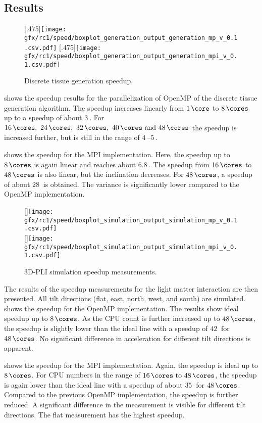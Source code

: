 \subsection{Results}
%
\begin{figure}[!t]
\centering
{}[.475\textwidth]{\texttt{[image: gfx/rc1/speed/boxplot\_generation\_output\_generation\_mp\_v\_0.1.csv.pdf]}}
\hfill
{}[.475\textwidth]{\texttt{[image: gfx/rc1/speed/boxplot\_generation\_output\_generation\_mpi\_v\_0.1.csv.pdf]}}
\caption[]{Discrete tissue generation speedup.}
\end{figure}
%
 shows the speedup results for the parallelization of \ac{OpenMP} of the discrete tissue generation algorithm.
The speedup increases linearly from $\SI{1}{\core}$ to $\SI{8}{\cores}$ up to a speedup of about $\SI{3}{}$.
For $\SIlist{16;24;32;40;48}{\cores}$ the speedup is increased further, but is still in the range of $\SIrange{4}{5}{}$.
\par
%
 shows the speedup for the \ac{MPI} implementation.
Here, the speedup up to $\SI{8}{\cores}$ is again linear and reaches about $\SI{6.8}{}$.
The speedup from $\SI{16}{\cores}$ to $\SI{48}{\cores}$ is also linear, but the inclination decreases.
For $\SI{48}{\cores}$, a speedup of about $\SI{28}{}$ is obtained.
The variance is significantly lower compared to the \ac{OpenMP} implementation.
\par
%
\begin{figure}[!t]
\centering
{}[\textwidth]{\texttt{[image: gfx/rc1/speed/boxplot\_simulation\_output\_simulation\_mp\_v\_0.1.csv.pdf]}}
\\
[\textwidth]{\texttt{[image: gfx/rc1/speed/boxplot\_simulation\_output\_simulation\_mpi\_v\_0.1.csv.pdf]}}
\caption[]{\ac{3D-PLI} simulation speedup measurements.}
\end{figure}
%
The results of the speedup measurements for the light matter interaction are then presented.
All tilt directions (flat, east, north, west, and south) are simulated.
 shows the speedup for the \ac{OpenMP} implementation.
The results show ideal speedup up to $\SI{8}{\cores}$.
As the \ac{CPU} count is further increased up to $\SI{48}{\cores}$, the speedup is slightly lower than the ideal line with a speedup of $\SI{42}{}$ for $\SI{48}{\cores}$.
No significant difference in acceleration for different tilt directions is apparent.
\par
%
 shows the speedup for the \ac{MPI} implementation.
Again, the speedup is ideal up to $\SI{8}{\cores}$.
For \ac{CPU} numbers in the range of $\SIrange{16}{48}{\cores}$, the speedup is again lower than the ideal line with a speedup of about $\SI{35}{}$ for $\SI{48}{\cores}$.
Compared to the previous \ac{OpenMP} implementation, the speedup is further reduced.
A significant difference in the measurement is visible for different tilt directions.
The flat measurement has the highest speedup.
%
%
%
